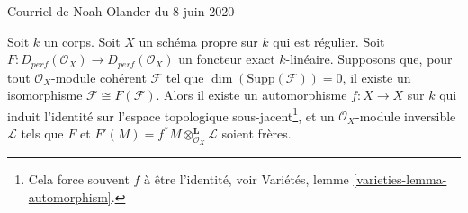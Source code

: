 \begin{lemma}
\label{lemma-noah}
\begin{reference}
Courriel de Noah Olander du 8 juin 2020
\end{reference}
Soit $k$ un corps. Soit $X$ un schéma propre sur $k$ qui est régulier.
Soit $F : D_{perf}(\mathcal{O}_X) \to D_{perf}(\mathcal{O}_X)$
un foncteur exact $k$-linéaire. Supposons que, pour tout
$\mathcal{O}_X$-module cohérent $\mathcal{F}$ tel que $\dim(\text{Supp}(\mathcal{F})) = 0$,
il existe un isomorphisme $\mathcal{F} \cong F(\mathcal{F})$.
Alors il existe un automorphisme $f : X \to X$ sur $k$
qui induit l'identité
sur l'espace topologique sous-jacent\footnote{Cela force souvent $f$
à être l'identité, voir Variétés, lemme \ref{varieties-lemma-automorphism}.},
et un $\mathcal{O}_X$-module inversible $\mathcal{L}$
tels que $F$ et $F'(M) = f^*M \otimes_{\mathcal{O}_X}^\mathbf{L} \mathcal{L}$
soient frères.
\end{lemma}

